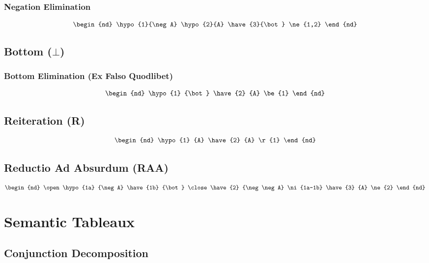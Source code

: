 \documentclass[12pt,a4paper,openany]{article}
\begin{document}
\subsubsection{Negation Elimination}

\[
\begin{nd}
 \hypo{1}{\neg A}
 \hypo{2}{A}
 \have{3}{\bot} \ne{1,2}
\end{nd}
\]

\subsection{Bottom ($\bot$)}\label{bottom}

\subsubsection{Bottom Elimination (Ex Falso Quodlibet)}
\[
\begin{nd}
 \hypo{1} {\bot}
 \have{2} {A}   \be{1}
\end{nd}
\]

\subsection{Reiteration (R)}\label{reiteration}
\[
\begin{nd}
 \hypo{1} {A}
 \have{2} {A} \r{1}
\end{nd}
\]

\subsection{Reductio Ad Absurdum (RAA)}\label{reductio-ad-absurdum-raa-nd}

\[
\begin{nd}
 \open
 \hypo{1a} {\neg A}
 \have{1b} {\bot}
 \close
 \have{2} {\neg\neg A}  \ni{1a-1b}
  \have{3} {A} \ne{2}
\end{nd}
\]


\section{Semantic Tableaux}

\subsection{Conjunction Decomposition }
\begin{center}
\end{center}
\end{document}
